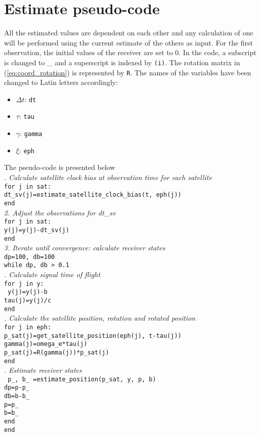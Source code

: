 \documentclass[]{article}
\begin{document}
\section{Estimate pseudo-code}
All the estimated values are dependent on each other and any calculation of one will be performed using the current estimate of the others as input. For the first observation, the initial values of the receiver are set to 0. In the code, a subscript is changed to \_ and a superscript is indexed by \texttt{(i)}. The rotation matrix in (\ref{eq:coord_rotation}) is represented by \texttt{R}. The names of the variables have been changed to Latin letters accordingly: 
\begin{itemize} 
\item $\Delta t$: \texttt{dt}
\item $\tau$: \texttt{tau}
\item $\gamma$: \texttt{gamma }
\item $\xi$: \texttt{eph}
\end{itemize}
The pseudo-code is presented below \\
\noindent\makebox[\linewidth]{\rule{0.8\paperwidth}{0.4pt}}
\textit{. Calculate satellite clock bias at observation time for each satellite}\\
\texttt{for j in sat:\\
\indent dt\_sv(j)=estimate\_satellite\_clock\_bias(t, eph(j))\\
end
}\\
\textit{2. Adjust the observations for dt\_sv}\\
\texttt{for j in sat:\\
\indent y(j)=y(j)-dt\_sv(j)\\
end
}\\
\textit{3. Iterate until convergence: calculate receiver states}\\
\texttt{dp=100, db=100\\
while dp, db > 0.1\\}
\textit{. Calculate signal time of flight}\\
\indent \texttt{for j in y:}\\
\texttt{ 
\indent\indent y(j)=y(j)-b\\
\indent\indent tau(j)=y(j)/c \\
\indent end}\\
\textit{. Calculate the satellite position, rotation and rotated position}\\
\indent \texttt{for j in eph:\\
\indent\indent p\_sat(j)=get\_satellite\_position(eph(j), t-tau(j))\\
\indent\indent gamma(j)=omega\_e*tau(j)\\
\indent\indent p\_sat(j)=R(gamma(j))*p\_sat(j)\\
\indent end\\}
\textit{. Estimate receiver states}\\
\texttt{
\indent p\_, b\_ =estimate\_position(p\_sat, y, p, b)\\
\indent dp=p-p\_\\
\indent db=b-b\_\\
\indent p=p\_\\
\indent b=b\_\\
\indent end\\
end\\
}
\noindent\makebox[\linewidth]{\rule{0.8\paperwidth}{0.4pt}}
\end{document}
